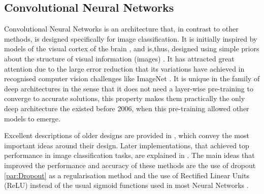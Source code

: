 \documentclass[a4paper]{article}
\begin{document}
		\subsection{Convolutional Neural Networks}
		\label{sec:CNN}			
		Convolutional Neural Networks is an architecture that, in contrast to other methods, is designed specifically for image classification. It is initially inspired by models of the visual cortex of the brain \cite{Fukushima1980}, and is,thus, designed using simple priors about the structure of visual information (images) \cite{Bengio2013c}. It has attracted great attention due to the large error reduction that its variations have achieved in recognised computer vision challenges like ImageNet \cite{Deng2009a}. It is unique in the family of deep architectures in the sense that it does not need a layer-wise pre-training to converge to accurate solutions, this property makes them practically the only deep architecture the existed before 2006, when this pre-training allowed other models to emerge.		
		
		Excellent descriptions of older designs are provided in \cite{LeCun1989,LeCun1990,Lecun1995,LeCun1998}, which convey the most important ideas around their design. Later implementations, that achieved top performance in image classification tasks, are explained in \cite{Krizhevsky2012}. The main ideas that improved the performance and accuracy of these methods are the use of dropout \ref{par:Dropout} as a regularisation method and the use of Rectified Linear Units (ReLU) instead of the usual sigmoid functions used in most Neural Networks \cite{Dahl2013}.	
		
\end{document}
